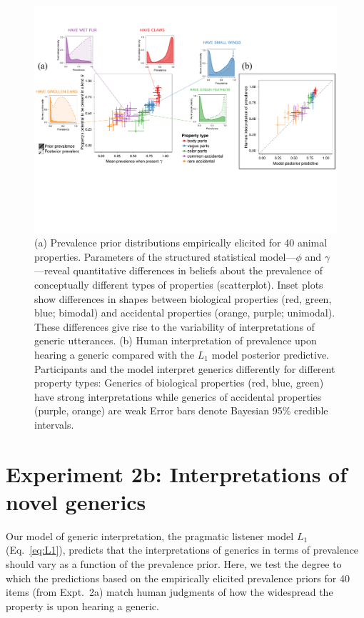 \documentclass[12pt,letterpaper]{article}
\begin{document}
\begin{figure}
\centering
    \includegraphics[width=\columnwidth]{prevalence-implied-wPriors}
    \caption{(a) Prevalence prior distributions empirically elicited for 40 animal properties.
    Parameters of the structured statistical model---$\phi$ and $\gamma$---reveal quantitative differences in beliefs about the prevalence of conceptually different types of properties (scatterplot). 
    Inset plots show differences in shapes between biological properties (red, green, blue; bimodal) and accidental properties (orange, purple; unimodal).   
  These differences give rise to the variability of interpretations of generic utterances.
  (b)
  Human interpretation of prevalence upon hearing a generic compared with the $L_1$ model posterior predictive. 
    Participants and the model interpret generics differently for different property types: Generics of biological properties (red, blue, green) have  strong interpretations while generics of accidental properties (purple, orange) are weak 
      Error bars denote Bayesian 95\% credible intervals.
  }
  \label{fig:prior2}
\end{figure}




\section*{Experiment 2b: Interpretations of novel generics}

Our model of generic interpretation, the pragmatic listener model $L_1$ (Eq.~\ref{eq:L1}), predicts that the interpretations of generics in terms of prevalence should vary as a function of the prevalence prior.
Here, we test the degree to which the predictions based on the empirically elicited prevalence priors for 40 items (from Expt.~2a) match human judgments of how the widespread the property is upon hearing a generic.
\end{document}
